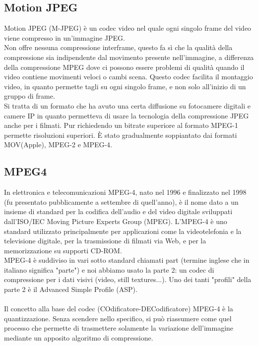 \subsection{Motion JPEG}
Motion JPEG (M-JPEG) è un codec video nel quale ogni singolo frame del video viene compresso in un'immagine JPEG.
\\
Non offre nessuna compressione interframe, questo fa sì che la qualità della compressione sia indipendente dal movimento presente nell'immagine, a differenza della compressione MPEG dove ci possono essere problemi di qualità quando il video contiene movimenti veloci o cambi scena. Questo codec facilita il montaggio video, in quanto permette tagli su ogni singolo frame, e non solo all'inizio di un gruppo di frame.
\\
Si tratta di un formato che ha avuto una certa diffusione su fotocamere digitali e camere IP in quanto permetteva di usare la tecnologia della compressione JPEG anche per i filmati. Pur richiedendo un bitrate superiore al formato MPEG-1 permette risoluzioni superiori. È stato gradualmente soppiantato dai formati MOV(Apple), MPEG-2 e MPEG-4\cite{M-JPEG}.

\subsection{MPEG4}
In elettronica e telecomunicazioni MPEG-4, nato nel 1996 e finalizzato nel 1998 (fu presentato pubblicamente a settembre di quell'anno), è il nome dato a un insieme di standard per la codifica dell'audio e del video digitale sviluppati dall'ISO/IEC Moving Picture Experts Group (MPEG). L'MPEG-4 è uno standard utilizzato principalmente per applicazioni come la videotelefonia e la televisione digitale, per la trasmissione di filmati via Web, e per la memorizzazione su supporti CD-ROM.
\\
MPEG-4 è suddiviso in vari sotto standard chiamati part (termine inglese che in italiano significa "parte") e noi abbiamo usato la parte 2: un codec di compressione per i dati visivi (video, still textures...). Uno dei tanti "profili" della parte 2 è il Advanced Simple Profile (ASP).
\\
\\
Il concetto alla base del codec (COdificatore-DECodificatore) MPEG-4 è la quantizzazione. Senza scendere nello specifico, si può riassumere come quel processo che permette di trasmettere solamente la variazione dell'immagine mediante un apposito algoritmo di compressione\cite{MPEG-4}.

